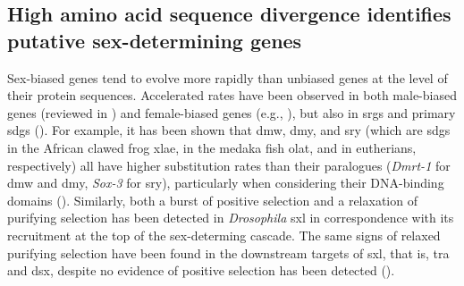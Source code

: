\subsection{High amino acid sequence divergence identifies putative sex-determining genes} \label{subsection:molecularEvolution-discussion-highaasd}
Sex-biased genes tend to evolve more rapidly than unbiased genes at the level of their protein sequences. Accelerated rates have been observed in both male-biased genes (reviewed in ) and female-biased genes (e.g., ), but also in \glspl{srg} and primary \glspl{sdg} (). For example, it has been shown that \gls{dmw}, \gls{dmy}, and \gls{sry} (which are \glspl{sdg} in the African clawed frog \gls{xlae}, in the medaka fish \gls{olat}, and in eutherians, respectively) all have higher substitution rates than their paralogues (\textit{Dmrt-1} for \gls{dmw} and \gls{dmy}, \textit{Sox-3} for \gls{sry}), particularly when considering their DNA-binding domains (). Similarly, both a burst of positive selection and a relaxation of purifying selection has been detected in \textit{Drosophila} \gls{sxl} in correspondence with its recruitment at the top of the sex-determing cascade. The same signs of relaxed purifying selection have been found in the downstream targets of \gls{sxl}, that is, \gls{tra} and \gls{dsx}, despite no evidence of positive selection has been detected ().

